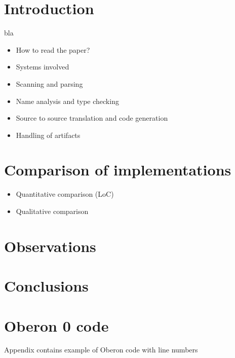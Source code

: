 \documentclass[english,preprint,12pt]{elsarticle}
\begin{document}

\section{Introduction}
\label{sec:intro}

bla
\begin{itemize}
\item How to read the paper?
\item Systems involved
\item Scanning and parsing
\item Name analysis and type checking
\item Source to source translation and code generation
\item Handling of artifacts
\end{itemize}












\section{Comparison of implementations}
\label{sec:comparison}
\begin{itemize}
\item Quantitative comparison (LoC)
\item Qualitative comparison
\end{itemize}

\section{Observations}
\label{sec:observations}

\section{Conclusions}
\label{sec:conclusions}



\appendix

\section{Oberon 0 code}
\label{sec:samples}
Appendix contains example of Oberon code with line numbers
\end{document}
